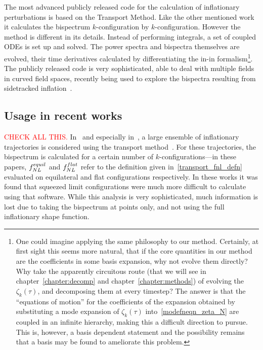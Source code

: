 The most advanced publicly released code for the calculation of inflationary perturbations
is based on the Transport Method.
Like the other mentioned work it calculates the bispectrum $k$-configuration by $k$-configuration.
However the method is different in its details.
Instead of performing integrals,
a set of coupled ODEs is set up and solved.
The power spectra and bispectra themselves are evolved, their time derivatives calculated by
differentiating the in-in formalism\footnote{
    One could imagine applying the same philosophy to our method.
    Certainly, at first sight this seems more natural, that if the core
    quantities in our method are the coefficients in some basis expansion,
    why not evolve them directly? Why take the apparently circuitous route
    (that we will see in chapter~\ref{chapter:decomp} and chapter~\ref{chapter:methods})
    of evolving the $\zeta_k(\tau)$, and decomposing them at every timestep?
    The answer is that the ``equations of motion'' for the coefficients of the expansion
    obtained by substituting a mode expansion of $\zeta_k(\tau)$ into~\eqref{modefneqn_zeta_N}
    are coupled in an infinite hierarchy, making this a difficult
    direction to pursue. This is, however, a basis dependent statement
    and the possibility remains that a basis may be found to ameliorate this problem.
    }.
The publicly released code is very sophisticated,
able to deal with multiple fields in curved field spaces,
recently being used to explore the bispectra resulting from
sidetracked inflation~\cite{RP_1}.
    \subsection{Usage in recent works}
    \textcolor{red}{CHECK ALL THIS.}
    In~\cite{RP_1, Fumagalli_2019} and especially
    in~\cite{Marzouk_D3}, a large ensemble of inflationary trajectories is considered
    using the transport method~\cite{transport_pytransport_2}.
    For these trajectories, the bispectrum is calculated for a certain number of $k$-configurations---in
    these papers, $f^{equil}_{NL}$ and $f_{NL}^{flat}$ refer to the definition given in~\eqref{transport_fnl_defn}
    evaluated on equilateral and flat configurations respectively.
    In these works it was found that squeezed limit configurations were much more
    difficult to calculate using that software. While this analysis is very sophisticated, much
    information is lost due to taking the bispectrum at points only, and not using the full
    inflationary shape function.
